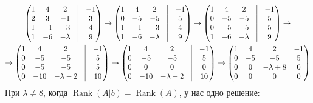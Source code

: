 \documentclass[a4paper, 12pt]{article}
\DeclareMathOperator{\Rank}{Rank}
\begin{document}
\begin{gather*}
    \begin{pmatrix}
        1 & 4 & 2 & \vrule & -1 \\ 
        2 & 3 & -1 & \vrule & 3 \\ 
        1 & -1 & -3 & \vrule & 4 \\ 
        1 & -6 & -\lambda & \vrule & 9 \\ 
    \end{pmatrix} \rightarrow
    \begin{pmatrix}
        1 & 4 & 2 & \vrule & -1 \\
        0 & -5 & -5 & \vrule & 5 \\
        1 & -1 & -3 & \vrule & 4 \\
        1 & -6 & -\lambda & \vrule & 9 
    \end{pmatrix} \rightarrow
    \begin{pmatrix}
        1 & 4 & 2 & \vrule & -1 \\
        0 & -5 & -5 & \vrule & 5 \\
        0 & -5 & -5 & \vrule & 5 \\
        1 & -6 & -\lambda & \vrule & 9
    \end{pmatrix} \rightarrow \\ \rightarrow
    \begin{pmatrix}
        1 & 4 & 2 & \vrule & -1 \\
        0 & -5 & -5 & \vrule & 5 \\
        0 & -5 & -5 & \vrule & 5 \\
        0 & -10 & -\lambda-2 & \vrule & 10
    \end{pmatrix} \rightarrow
    \begin{pmatrix}
        1 & 4 & 2 & \vrule & -1 \\
        0 & -5 & -5 & \vrule & 5 \\
        0 & 0 & 0 & \vrule & 0 \\
        0 & -10 & -\lambda-2 & \vrule & 10
    \end{pmatrix} \rightarrow 
    \begin{pmatrix}
        1 & 4 & 2 & -1 \\
        0 & -5 & -5 & 5 \\
        0 & 0 & -\lambda + 8 & 0 \\ 
        0 & 0 & 0 & 0 
    \end{pmatrix}
\end{gather*}
При $\lambda \ne 8$, когда $\Rank{(A|b)} = \Rank{(A)}$, у нас одно решение:
\end{document}
